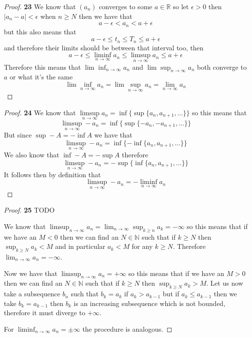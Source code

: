 \documentclass[11pt]{article}
\newcommand{\N}{\mathbb{N}}
\newcommand{\R}{\mathbb{R}}
\theoremstyle{definition}
\begin{document}
    \begin{proof}{\textbf{23}}
        We know that $(a_n)$ converges to some $a \in \R$ so let $\epsilon >0$ then
        $|a_n - a |<\epsilon$ when $n \geq N$ then we have that
        $$a-\epsilon<a_n<a+\epsilon$$
        but this also means that
        $$a-\epsilon\leq t_n\leq T_n \leq a+\epsilon$$
        and therefore their limits should be between that interval too, then
        $$a-\epsilon \leq \liminf_{n \to \infty} a_n \leq \limsup_{n \to \infty} a_n  \leq a+\epsilon$$
        Therefore this means that $\lim\inf_{n \to \infty} a_n$ and
        $\lim\sup_{n \to \infty} a_n$ both converge to $a$ or what it's the same
        $$\lim\inf_{n \to \infty} a_n = \lim\sup_{n \to \infty} a_n = \lim_{n \to \infty} a_n$$
    \end{proof}
    \begin{proof}{\textbf{24}}
        We know that 
        $\limsup\limits_{n \to \infty} a_n = \inf\{\sup\{a_n, a_{n+1}, ...\}\}$
        so this means that 
        $$\limsup\limits_{n \to \infty} -a_n = \inf\{\sup\{-a_n, -a_{n+1}, ...\}\}$$
        But since $\sup -A = -\inf A$ we have that
        $$\limsup\limits_{n \to \infty} -a_n = \inf\{-\inf\{a_n, a_{n+1}, ...\}\}$$
        We also know that $\inf -A = -\sup A$ therefore
        $$\limsup\limits_{n \to \infty} -a_n = -\sup\{\inf\{a_n, a_{n+1}, ...\}\}$$
        It follows then by definition that
        $$\limsup\limits_{n \to \infty} -a_n = -\liminf\limits_{n \to \infty} a_n$$
    \end{proof}
    \begin{proof}{\textbf{25}}
        TODO
        
        We know that
        $\limsup_{n \to \infty} a_n = \lim_{n \to \infty} \sup_{k \geq n} a_k = -\infty$
        so this means that if we have an $M < 0$ then we can find an $N \in \N$
        such that if $k \geq N$ then $\sup_{k \geq N} a_k < M$ and in particular
        $a_k < M$ for any $k \geq N$. Therefore $\lim_{n \to \infty} a_n = -\infty$.

        Now we have that $\limsup_{n \to \infty} a_n = +\infty$ so this means that if we
        have an $M>0$ then we can find an $N \in \N$ such that if $k \geq N$ then
        $\sup_{k\geq N}a_k > M$.
        Let us now take a subsequence $b_n$ such that $b_k = a_k$ if $a_k > a_{k-1}$ but
        if $a_k \leq a_{k-1}$ then we take $b_k = a_{k-1}$ then $b_k$
        is an increasing subsequence which is not bounded, therefore it must diverge to
        $+\infty$.


        For $\liminf_{n \to \infty} a_n = \pm\infty$ the procedure is analogous.
    \end{proof}
\end{document}
